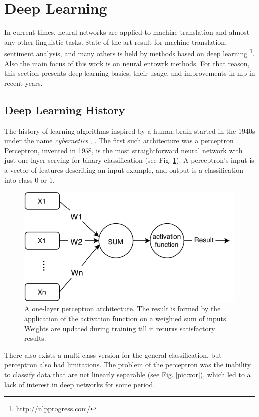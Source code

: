 \section{Deep Learning}
In current times, neural networks are applied to machine translation and almost any other linguistic tasks. State-of-the-art result for machine translation, sentiment analysis, and many others is held by methods based on deep learning \footnote{http://\acrshort{nlp}progress.com/}. Also the main focus of this work is on neural entowrk methods. For that reason, this section presents deep learning basics, their usage, and improvements in \acrshort{nlp} in recent years. 

\subsection{Deep Learning History}
The history of learning algorithms inspired by a human brain started in the 1940s under the name \textit{cybernetics} \citep{Goodfellow-et-al-2016}, \citep{McCulloch}. The first such architecture was a perceptron \citep{Rosenblatt1958}.
Perceptron, invented in 1958, is the most straightforward neural network with just one layer serving for binary classification (see Fig. \ref{pic:perceptron}). A perceptron's input is a vector of features describing an input example, and output is a classification into class 0 or 1.

\begin{figure}[ht]
\centering
\includegraphics[width=0.8\columnwidth]{../img/perceptron}
\caption{A one-layer perceptron architecture. The result is formed by the application of the activation function on a weighted sum of inputs. Weights are updated during training till it returns satisfactory results. }
\label{pic:perceptron}
\end{figure}

There also exists a multi-class version for the general classification,  but perceptron also had limitations. The problem of the perceptron was the inability to classify data that are not linearly separable \citep{Minsky2017} (see Fig. \ref{pic:xor}), which led to a lack of interest in deep networks for some period.

